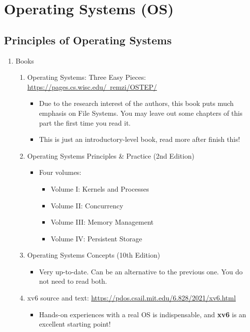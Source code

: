 \documentclass{article}
\begin{document}
\section{Operating Systems (OS)}
\subsection{Principles of Operating Systems}
\begin{enumerate}
    \item Books
        \begin{enumerate}
        \item Operating Systems: Three Easy Pieces:
        \href{https://pages.cs.wisc.edu/~remzi/OSTEP/}{https://pages.cs.wisc.edu/~remzi/OSTEP/}
        \begin{itemize}
            \item Due to the research interest of the authors, this book puts much emphasis on File Systems.
            You may leave out some chapters of this part the first time you read it.
            \item This is just an introductory-level book, read more after finish this!
        \end{itemize}
        \item Operating Systems Principles \& Practice (2nd Edition)
        \begin{itemize}
            \item Four volumes:
            \begin{itemize}
                \item Volume I: Kernels and Processes \cite{anderson2014operating1}
                \item Volume II: Concurrency \cite{andersonoperating2}
                \item Volume III: Memory Management \cite{andersonoperating3}
                \item Volume IV: Persistent Storage \cite{andersonoperating4}
            \end{itemize}
        \end{itemize}
        \item Operating Systems Concepts (10th Edition) \cite{peterson1985operating}
        \begin{itemize}
            \item Very up-to-date.
            Can be an alternative to the previous one.
            You do not need to read both.
        \end{itemize}
        \item xv6 source and text:
        \href{https://pdos.csail.mit.edu/6.828/2021/xv6.html}{https://pdos.csail.mit.edu/6.828/2021/xv6.html}
        \begin{itemize}
            \item Hands-on experiences with a real OS is indispensable, and \textbf{xv6} is an excellent starting point!
        \end{itemize}    


\end{enumerate}
\end{enumerate}
\end{document}
